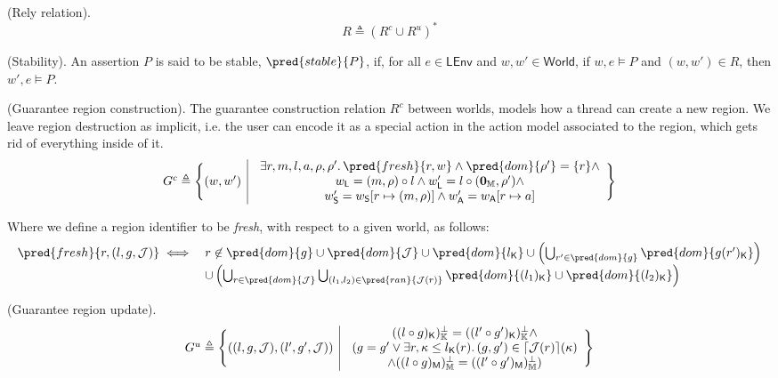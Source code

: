 \param (Rely relation).
\[
	R \triangleq (R^c \cup R^u)^*
\]
%	

 (Stability). An assertion $P$ is said to be stable, $\pred{stable}{P}$, if, for all $e \in \mathsf{LEnv}$ and $w, w' \in \mathsf{World}$, if $w, e \vDash P$ and $(w, w') \in R$, then $w', e \vDash P$.

 (Guarantee region construction). The guarantee construction relation $R^c$ between worlds, models how a thread can create a new region. We leave region destruction as implicit, i.e. the user can encode it as a special action in the action model associated to the region, which gets rid of everything inside of it.
\[
\begin{array}{r | l}
	G^c \triangleq \Bigg\{ (w, w')
	&
	\begin{array}{c}
		\exists r, m, l, a, \rho, \rho' \ldotp \pred{fresh}{r, w} \land \pred{dom}{\rho'} = \{r\} \land
		\\
		w_\mathsf{L} = (m, \rho) \circ l \land w'_\mathsf{L} = l \circ (\mathbf{0}_\mathbb{M}, \rho') \land
		\\
		w'_\mathsf{S} = w_\mathsf{S}[r \mapsto (m, \rho) ] \land w'_\mathsf{A} = w_\mathsf{A}[r \mapsto a]
	\end{array}
	\Bigg\}
\end{array}
\]

Where we define a region identifier to be \textit{fresh}, with respect to a given world, as follows:
\[
\begin{array}{r l}
	\pred{fresh}{r, (l, g, \mathcal{J})} \iff
	&
	r \not\in \pred{dom}{g} \cup \pred{dom}{\mathcal{J}} \cup \pred{dom}{l_\mathsf{K}} \cup \left( \bigcup_{r' \in \pred{dom}{g}} \pred{dom}{g(r')_\mathsf{K}} \right)
	\\
	& \cup \left( \bigcup_{r \in \pred{dom}{\mathcal{J}}} \bigcup_{(l_1, l_2) \in \pred{ran}{\mathcal{J}(r)}} \pred{dom}{(l_1)_\mathsf{K}} \cup \pred{dom}{(l_2)_\mathsf{K}} \right)
\end{array}	
\]

 (Guarantee region update).
\[
\begin{array}{r | l}
	G^u \triangleq \Bigg\{ ((l, g, \mathcal{J}), (l', g', \mathcal{J}))
	&
	\begin{array}{c}
		((l \circ g)_\mathsf{K})_\mathbb{K}^\bot = ((l' \circ g')_\mathsf{K})_\mathbb{K}^\bot \land \\
		(g = g' \lor \exists r, \kappa \leq l_\mathsf{K}(r) \ldotp (g, g') \in \lceil \mathcal{J}(r) \rceil(\kappa)  \\ \land ((l \circ g)_\mathsf{M})_\mathbb{M}^\bot = ((l' \circ g')_\mathsf{M})_\mathbb{M}^\bot )
	\end{array}
	\Bigg\}
\end{array}
\]

